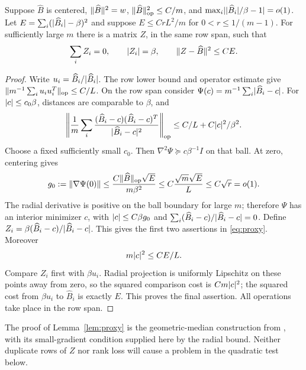 \begin{lemma}\label{lem:proxy}
Suppose $\widehat B$ is centered, $\lVert \widehat B\rVert^2=w$,
$\lVert \widehat B\rVert_{\rm op}^2\le C/m$, and
$\max_i\lvert \lvert \widehat B_i\rvert/\beta-1\rvert=o(1)$.
Let $E=\sum_i(\lvert \widehat B_i\rvert-\beta)^2$ and suppose
$E\le CrL^2/m$ for $0<r\le1/(m-1)$. For sufficiently large $m$ there is a matrix $Z$,
in the same row span, such that
\begin{equation}\label{eq:proxy}
 \sum_i Z_i=0,\qquad \lvert Z_i\rvert=\beta,\qquad
                       \lVert Z-\widehat B\rVert^2\le CE.
\end{equation}
\end{lemma}
\begin{proof}
Write $u_i=\widehat B_i/\lvert \widehat B_i\rvert$. The row lower bound and
operator estimate give
$\lVert m^{-1}\sum_i u_iu_i^T\rVert_{\rm op}\le C/L$.
On the row span consider
$\Psi(c)=m^{-1}\sum_i\lvert \widehat B_i-c\rvert$.
For $\lvert c\rvert\le c_0\beta$, distances are comparable to $\beta$, and
\[
 \left\lVert\frac1m\sum_i
 \frac{(\widehat B_i-c)(\widehat B_i-c)^T}
                         {\lvert \widehat B_i-c\rvert^2}\right\rVert_{\rm op}
               \le C/L+C\lvert c\rvert^2/\beta^2.
\]
Choose a fixed sufficiently small $c_0$. Then
$\nabla^2\Psi\succeq c\beta^{-1}I$ on that ball.
At zero, centering gives
\[
 g_0:=\lVert \nabla\Psi(0)\rVert
 \le\frac{C\lVert \widehat B\rVert_{\rm op}\sqrt E}{m\beta^2}
 \le C\frac{\sqrt m\sqrt E}{L}\le C\sqrt r=o(1).
\]
The radial derivative is positive on the ball boundary for large $m$;
therefore $\Psi$ has an interior minimizer $c$, with
$\lvert c\rvert\le C\beta g_0$ and
$\sum_i(\widehat B_i-c)/\lvert \widehat B_i-c\rvert=0$.
Define $Z_i=\beta(\widehat B_i-c)/\lvert \widehat B_i-c\rvert$.
This gives the first two assertions in \eqref{eq:proxy}. Moreover
\[
 m\lvert c\rvert^2\le C E/L.
\]
Compare $Z_i$ first with $\beta u_i$. Radial projection is uniformly
Lipschitz on these points away from zero, so the squared comparison
cost is $Cm\lvert c\rvert^2$; the squared cost from $\beta u_i$ to
$\widehat B_i$ is exactly $E$. This proves the final assertion.
All operations take place in the row span.
\end{proof}

\begin{remark}
The proof of Lemma~\ref{lem:proxy} is the geometric-median construction
from \cite{rowcontrol}, with its small-gradient condition supplied here
by the radial bound. Neither duplicate rows of $Z$ nor rank loss
will cause a problem in the quadratic test below.
\end{remark}
